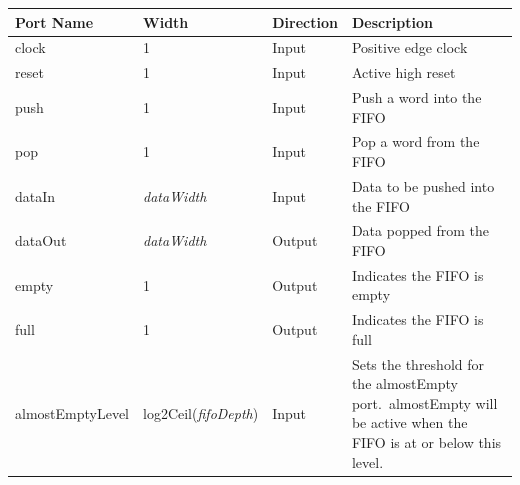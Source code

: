 \renewcommand*{\arraystretch}{1.4}
\begin{longtable}[H]{
    | p{}
    | p{}
    | p{}
    | p{} |
  }
  \hline
  \textbf{Port Name}           &
  \textbf{Width}               &
  \textbf{Direction}           &
  \textbf{Description}                     \\ \hline \hline

  clock                        &
  1                            &
  Input                        &
  Positive edge clock                      \\ \hline

  reset                        &
  1                            &
  Input                        &
  Active high reset                        \\ \hline

  push                         &
  1                            &
  Input                        &
  Push a word into the FIFO                \\ \hline

  pop                          &
  1                            &
  Input                        &
  Pop a word from the FIFO                 \\ \hline

  dataIn                       &
  \textit{dataWidth}           &
  Input                        &
  Data to be pushed into the FIFO          \\ \hline

  dataOut                      &
  \textit{dataWidth}           &
  Output                       &
  Data popped from the FIFO                \\ \hline

  empty                        &
  1                            &
  Output                       &
  Indicates the FIFO is empty              \\ \hline

  full                         &
  1                            &
  Output                       &
  Indicates the FIFO is full               \\ \hline

  almostEmptyLevel             &
  log2Ceil(\textit{fifoDepth}) &           %
  Input                        &
  Sets the threshold for the almostEmpty port.\ almostEmpty will be active
  when the FIFO is at or below this level. \\ \hline


\end{longtable}
